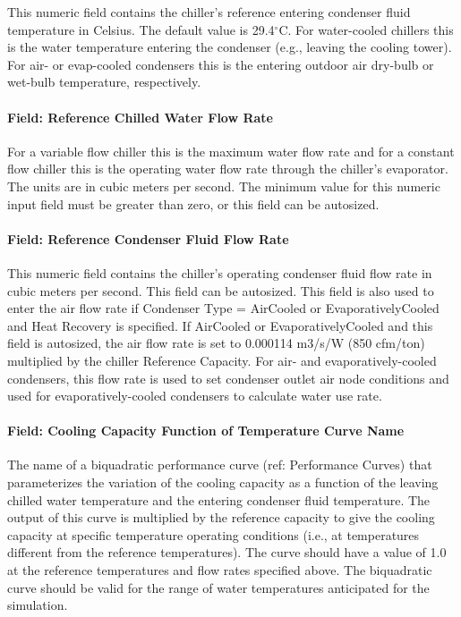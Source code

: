This numeric field contains the chiller's reference entering condenser fluid temperature in Celsius. The default value is 29.4$^\circ$C. For water-cooled chillers this is the water temperature entering the condenser (e.g., leaving the cooling tower). For air- or evap-cooled condensers this is the entering outdoor air dry-bulb or wet-bulb temperature, respectively.

\paragraph{Field: Reference Chilled Water Flow Rate}\label{field-reference-chilled-water-flow-rate}

For a variable flow chiller this is the maximum water flow rate and for a constant flow chiller this is the operating water flow rate through the chiller's evaporator. The units are in cubic meters per second. The minimum value for this numeric input field must be greater than zero, or this field can be autosized.

\paragraph{Field: Reference Condenser Fluid Flow Rate}\label{field-reference-condenser-fluid-flow-rate}

This numeric field contains the chiller's operating condenser fluid flow rate in cubic meters per second. This field can be autosized. This field is also used to enter the air flow rate if Condenser Type = AirCooled or EvaporativelyCooled and Heat Recovery is specified. If AirCooled or EvaporativelyCooled and this field is autosized, the air flow rate is set to 0.000114 m3/s/W (850 cfm/ton) multiplied by the chiller Reference Capacity. For air- and evaporatively-cooled condensers, this flow rate is used to set condenser outlet air node conditions and used for evaporatively-cooled condensers to calculate water use rate.

\paragraph{Field: Cooling Capacity Function of Temperature Curve Name}\label{field-cooling-capacity-function-of-temperature-curve-name}

The name of a biquadratic performance curve (ref: Performance Curves) that parameterizes the variation of the cooling capacity as a function of the leaving chilled water temperature and the entering condenser fluid temperature. The output of this curve is multiplied by the reference capacity to give the cooling capacity at specific temperature operating conditions (i.e., at temperatures different from the reference temperatures). The curve should have a value of 1.0 at the reference temperatures and flow rates specified above. The biquadratic curve should be valid for the range of water temperatures anticipated for the simulation.

